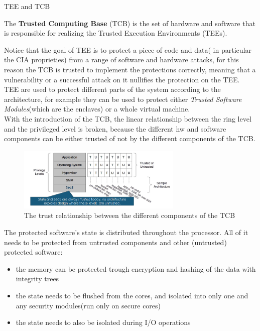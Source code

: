 \begin{section}{TEE and TCB}
  \begin{boxH}
    The \textbf{Trusted Computing Base} (TCB) is the set of hardware and software that is
    responsible for realizing the Trusted Execution Environments (TEEs).
  \end{boxH}
  Notice that the goal of TEE is to protect a piece of code and data( in particular the CIA
  proprieties) from a range of software and hardware attacks, for this reason the TCB is trusted to
  implement the protections correctly, meaning that a vulnerability or a successful attack on it
  nullifies the protection on the TEE.\\
  TEE are used to protect different parts of the system according to the architecture, for example
  they can be used to protect either \textit{Trusted Software Modules}(which are the enclaves) or 
  a whole virtual machine.\\

  With the introduction of the TCB, the linear relationship between the ring level and the
  privileged level is broken, because the different hw and software components can be either trusted
  of not by the different components of the TCB.\\
  \begin{figure}[H]
    \centering
    \includegraphics[width=0.7\textwidth]{img/hardware/ring trust.png}
    \caption{The trust relationship between the different components of the TCB}
  \end{figure}
  The protected software’s state is distributed throughout the processor. All of it needs to be
  protected from untrusted components and other (untrusted) protected software:
  \begin{itemize}
    \item the memory can be protected trough encryption and hashing of the data with integrity trees 
    \item the state needs to be flushed from the cores, and isolated into only one and any security
      modules(run only on secure cores)
    \item the state needs to also be isolated during I/O operations
  \end{itemize}


\end{section}
